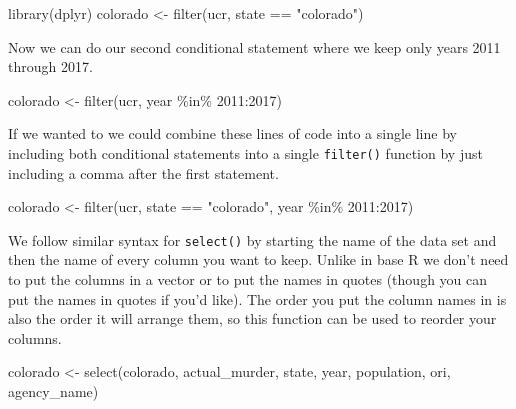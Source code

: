 \documentclass[
]{krantz}
\makeatletter
\newenvironment{Shaded}{\begin{snugshade}}{\end{snugshade}}
\newcommand{\DecValTok}[1]{\textcolor[rgb]{0.06,0.06,0.06}{#1}}
\newcommand{\FunctionTok}[1]{\textcolor[rgb]{0,0,0}{#1}}
\newcommand{\NormalTok}[1]{#1}
\newcommand{\OtherTok}[1]{\textcolor[rgb]{0.37,0.37,0.37}{#1}}
\newcommand{\SpecialCharTok}[1]{\textcolor[rgb]{0,0,0}{#1}}
\newcommand{\StringTok}[1]{\textcolor[rgb]{0.5,0.5,0.5}{#1}}
\newenvironment{kframe}{%
\medskip{}
\setlength{\fboxsep}{.8em}
 \def\at@end@of@kframe{}%
 \ifinner\ifhmode%
  \def\at@end@of@kframe{\end{minipage}}%
  \begin{minipage}{\columnwidth}%
 \fi\fi%
 \def\FrameCommand##1{\hskip\@totalleftmargin \hskip-\fboxsep
 \colorbox{shadecolor}{##1}\hskip-\fboxsep
     \hskip-\linewidth \hskip-\@totalleftmargin \hskip\columnwidth}%
 \MakeFramed {\advance\hsize-\width
   \@totalleftmargin\z@ \linewidth\hsize
   \@setminipage}}%
 {\par\unskip\endMakeFramed%
 \at@end@of@kframe}
\renewenvironment{Shaded}{\begin{kframe}}{\end{kframe}}
\makeatother
\begin{document}
\begin{Shaded}
\begin{Highlighting}[]
\FunctionTok{library}\NormalTok{(dplyr)}
\NormalTok{colorado }\OtherTok{\textless{}{-}} \FunctionTok{filter}\NormalTok{(ucr, state }\SpecialCharTok{==} \StringTok{"colorado"}\NormalTok{)}
\end{Highlighting}
\end{Shaded}

Now we can do our second conditional statement where we keep only years 2011 through 2017.

\begin{Shaded}
\begin{Highlighting}[]
\NormalTok{colorado }\OtherTok{\textless{}{-}} \FunctionTok{filter}\NormalTok{(ucr, year }\SpecialCharTok{\%in\%} \DecValTok{2011}\SpecialCharTok{:}\DecValTok{2017}\NormalTok{)}
\end{Highlighting}
\end{Shaded}

If we wanted to we could combine these lines of code into a single line by including both conditional statements into a single \texttt{filter()} function by just including a comma after the first statement.

\begin{Shaded}
\begin{Highlighting}[]
\NormalTok{colorado }\OtherTok{\textless{}{-}} \FunctionTok{filter}\NormalTok{(ucr, state }\SpecialCharTok{==} \StringTok{"colorado"}\NormalTok{, year }\SpecialCharTok{\%in\%} \DecValTok{2011}\SpecialCharTok{:}\DecValTok{2017}\NormalTok{)}
\end{Highlighting}
\end{Shaded}

We follow similar syntax for \texttt{select()} by starting the name of the data set and then the name of every column you want to keep. Unlike in base R we don't need to put the columns in a vector or to put the names in quotes (though you can put the names in quotes if you'd like). The order you put the column names in is also the order it will arrange them, so this function can be used to reorder your columns.

\begin{Shaded}
\begin{Highlighting}[]
\NormalTok{colorado }\OtherTok{\textless{}{-}} \FunctionTok{select}\NormalTok{(colorado, actual\_murder, state, year, population, ori, agency\_name)}
\end{Highlighting}
\end{Shaded}
\end{document}
